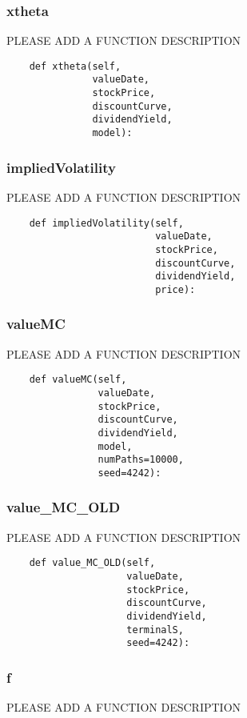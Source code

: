 \documentclass[twoside,11pt]{book}
\begin{document}
\subsubsection*{{\bf xtheta}}
PLEASE ADD A FUNCTION DESCRIPTION

\begin{lstlisting}
    def xtheta(self,
               valueDate,
               stockPrice,
               discountCurve,
               dividendYield,
               model):
\end{lstlisting}

\subsubsection*{{\bf impliedVolatility}}
PLEASE ADD A FUNCTION DESCRIPTION

\begin{lstlisting}
    def impliedVolatility(self,
                          valueDate,
                          stockPrice,
                          discountCurve,
                          dividendYield,
                          price):
\end{lstlisting}

\subsubsection*{{\bf valueMC}}
PLEASE ADD A FUNCTION DESCRIPTION

\begin{lstlisting}
    def valueMC(self,
                valueDate,
                stockPrice,
                discountCurve,
                dividendYield,
                model,
                numPaths=10000,
                seed=4242):
\end{lstlisting}

\subsubsection*{{\bf value\_MC\_OLD}}
PLEASE ADD A FUNCTION DESCRIPTION

\begin{lstlisting}
    def value_MC_OLD(self,
                     valueDate,
                     stockPrice,
                     discountCurve,
                     dividendYield,
                     terminalS,
                     seed=4242):
\end{lstlisting}

\subsubsection*{{\bf f}}
PLEASE ADD A FUNCTION DESCRIPTION
\end{document}

